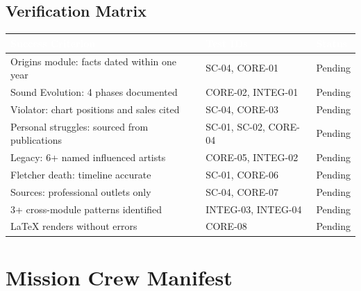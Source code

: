 \documentclass[11pt,letterpaper]{article}
\newcommand{\tableheader}[1]{\textbf{\sffamily\textcolor{white}{#1}}}
\begin{document}
\subsection{Verification Matrix}

\begin{center}
\begin{tabularx}{\textwidth}{L{4.5cm}L{3cm}C{2.5cm}}
\toprule
{}
\tableheader{Success Criterion} & \tableheader{Test IDs} & \tableheader{Status} \\
\midrule
Origins module: facts dated within one year & SC-04, CORE-01 & Pending \\
Sound Evolution: 4 phases documented & CORE-02, INTEG-01 & Pending \\
Violator: chart positions and sales cited & SC-04, CORE-03 & Pending \\
Personal struggles: sourced from publications & SC-01, SC-02, CORE-04 & Pending \\
Legacy: 6+ named influenced artists & CORE-05, INTEG-02 & Pending \\
Fletcher death: timeline accurate & SC-01, CORE-06 & Pending \\
Sources: professional outlets only & SC-04, CORE-07 & Pending \\
3+ cross-module patterns identified & INTEG-03, INTEG-04 & Pending \\
LaTeX renders without errors & CORE-08 & Pending \\
\bottomrule
\end{tabularx}
\end{center}

\section{Mission Crew Manifest}
\end{document}
